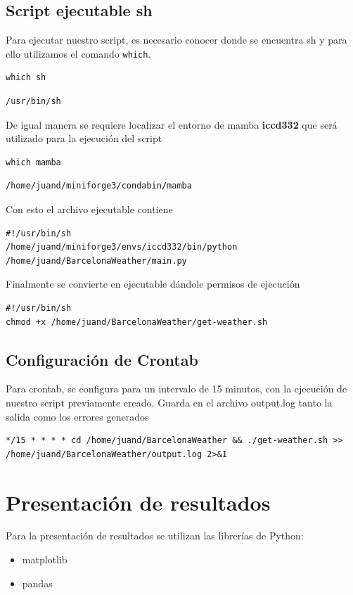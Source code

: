 \documentclass[11pt]{article}
\begin{document}
\subsection{Script ejecutable sh}
\label{sec:org4789f19}
Para ejecutar nuestro script, es necesario conocer donde se encuentra
sh y para ello utilizamos el comando \texttt{which}.
\begin{verbatim}
which sh
\end{verbatim}
\label{org728632a}
\begin{verbatim}
/usr/bin/sh
\end{verbatim}

De igual manera se requiere localizar el entorno de mamba \textbf{iccd332}
que será utilizado para la ejecución del script

\begin{verbatim}
which mamba
\end{verbatim}
\label{orgc8a5cf5}
\begin{verbatim}
/home/juand/miniforge3/condabin/mamba
\end{verbatim}

Con esto el archivo ejecutable contiene
\begin{verbatim}
#!/usr/bin/sh
/home/juand/miniforge3/envs/iccd332/bin/python /home/juand/BarcelonaWeather/main.py
\end{verbatim}
Finalmente se convierte en ejecutable dándole permisos de ejecución
\begin{verbatim}
#!/usr/bin/sh
chmod +x /home/juand/BarcelonaWeather/get-weather.sh
\end{verbatim}
\subsection{Configuración de Crontab}
\label{sec:orgb9bab75}
Para crontab, se configura para un intervalo de 15 minutos, con la
ejecución de nuestro script previamente creado. Guarda en el archivo
output.log tanto la salida como los errores generados
\begin{verbatim}
*/15 * * * * cd /home/juand/BarcelonaWeather && ./get-weather.sh >> /home/juand/BarcelonaWeather/output.log 2>&1
\end{verbatim}
\section{Presentación de resultados}
\label{sec:orgc2a6a9d}
Para la presentación de resultados se utilizan las librerías de Python:
\begin{itemize}
\item matplotlib
\item pandas
\end{itemize}
\end{document}
